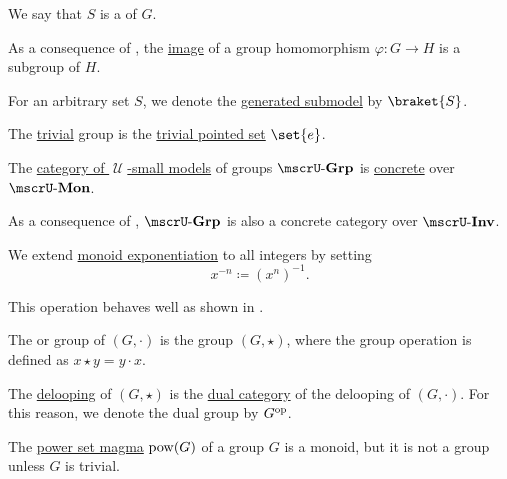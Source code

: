 \begin{definition}
\begin{thmenum}
    We say that \( S \) is a  of \( G \).

    As a consequence of , the \hyperref[def:multi_valued_function/image]{image} of a group homomorphism \( \varphi: G \to H \) is a subgroup of \( H \).

    For an arbitrary set \( S \), we denote the \hyperref[def:first_order_generated_substructure]{generated submodel} by \( \braket{ S } \).

      The \hyperref[thm:substructures_form_complete_lattice/bottom]{trivial} group is the \hyperref[def:pointed_set/trivial]{trivial pointed set} \( \set{ e } \).

     The \hyperref[def:category_of_small_first_order_models]{category of \( \mscrU \)-small models} of groups \( \ucat{Grp} \) is \hyperref[def:concrete_category]{concrete} over \hyperref[def:monoid]{\( \ucat{Mon} \)}.

    As a consequence of , \( \ucat{Grp} \) is also a concrete category over \( \ucat{Inv} \).

     We extend \hyperref[def:monoid/exponentiation]{monoid exponentiation} to all integers by setting
    \begin{equation*}
      x^{-n} \coloneqq (x^n)^{-1}.
    \end{equation*}

    This operation behaves well as shown in .

     The  or  group of \( (G, \cdot) \) is the group \( (G, \star) \), where the group operation is defined as \( x \star y = y \cdot x \).

    The \hyperref[def:monoid_delooping]{delooping} of \( (G, \star) \) is the \hyperref[def:dual_category]{dual category} of the delooping of \( (G, \cdot) \). For this reason, we denote the dual group by \( G^{\operatorname{op}} \).
  \end{thmenum}
\end{definition}

\begin{example}\label{ex:power_set_is_not_a_group}
  The \hyperref[def:magma/power_set]{power set magma} \( \operatorname{pow}(G) \) of a group \( G \) is a monoid, but it is not a group unless \( G \) is trivial.
\end{example}

